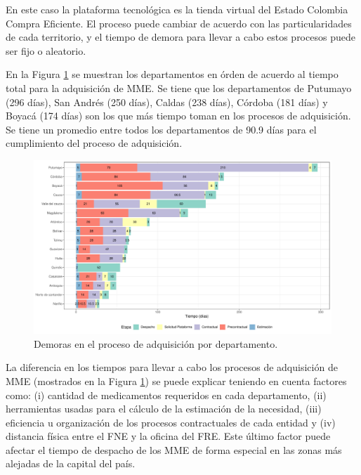 \documentclass[
  oneside]{book}
\begin{document}
En este caso la plataforma tecnológica es la tienda virtual del Estado Colombia Compra Eficiente. El proceso puede cambiar de acuerdo con las particularidades de cada territorio, y el tiempo de demora para llevar a cabo estos procesos puede ser fijo o aleatorio.

En la Figura \ref{fig:EtapasProcesoAdquisicion} se muestran los departamentos en órden de acuerdo al tiempo total para la adquisición de MME. Se tiene que los departamentos de Putumayo (296 días), San Andrés (250 días), Caldas (238 días), Córdoba (181 días) y Boyacá (174 días) son los que más tiempo toman en los procesos de adquisición. Se tiene un promedio entre todos los departamentos de 90.9 días para el cumplimiento del proceso de adquisición.

\begin{figure}[t]

{\centering \includegraphics[width=1\linewidth]{InformeFinal_files/figure-latex/EtapasProcesoAdquisicion-1} 

}

\caption{Demoras en el proceso de adquisición por departamento.}\label{fig:EtapasProcesoAdquisicion}
\end{figure}

La diferencia en los tiempos para llevar a cabo los procesos de adquisición de MME (mostrados en la Figura \ref{fig:EtapasProcesoAdquisicion}) se puede explicar teniendo en cuenta factores como: (i) cantidad de medicamentos requeridos en cada departamento, (ii) herramientas usadas para el cálculo de la estimación de la necesidad, (iii) eficiencia u organización de los procesos contractuales de cada entidad y (iv) distancia física entre el FNE y la oficina del FRE. Este último factor puede afectar el tiempo de despacho de los MME de forma especial en las zonas más alejadas de la capital del país.
\end{document}
